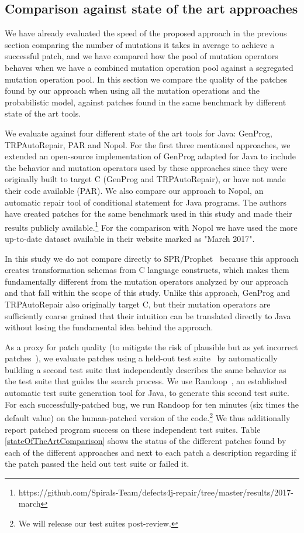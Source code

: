\documentclass[conference]{IEEEtran}
\begin{document}
\subsection{Comparison against state of the art approaches}
We have already evaluated the speed of the proposed approach in the previous section comparing the number of mutations it takes in average to achieve a successful patch, and we have compared how the pool of mutation operators behaves when we have a combined mutation operation pool against a segregated mutation operation pool.
In this section we compare the quality of the patches found by our approach when using all the mutation operations and the probabilistic model, against patches found in the same benchmark by different state of the art tools.

We evaluate against four different state of the art tools for Java: GenProg, TRPAutoRepair, PAR and Nopol.
For the first three mentioned approaches, we extended an open-source implementation of GenProg adapted for Java to include the behavior and mutation operators used by these approaches since they were originally built to target C (GenProg and TRPAutoRepair), or have not made their code available (PAR). We also compare our approach to Nopol\cite{xuan:hal-01285008}, an automatic repair tool of conditional statement for Java programs. The authors have created patches for the same benchmark used in this study\cite{martinez2016} and made their results publicly available.\footnote{https://github.com/Spirals-Team/defects4j-repair/tree/master/results/2017-march} For the comparison with Nopol we have used the more up-to-date dataset available in their website marked as "March 2017".

In this study we do not compare directly to SPR/Prophet~\cite{long16proph} because this approach creates transformation schemas from C language constructs, which makes them fundamentally different from the mutation operators analyzed by our approach and that fall within the scope of this study. Unlike this approach, GenProg and TRPAutoRepair also originally target C, but their mutation operators are sufficiently coarse grained that their intuition can be translated directly to Java without losing the fundamental idea behind the approach. 

As a proxy for patch quality (to
mitigate the risk of plausible but as yet incorrect patches~\cite{Qi15}), we
evaluate patches using a held-out test suite~\cite{legoues2012,Smith15} by automatically building a second
test suite that independently describes the same behavior as the test suite that
guides the search process. We use Randoop~\cite{pacheco07}, an established
automatic test suite generation tool for Java, to generate this second test
suite. 
For each successfully-patched bug, we 
run Randoop for ten minutes (six times the default value) on the human-patched
version of the code.\footnote{We will release our test suites post-review.}  We
thus additionally report patched program success on these independent test
suites. 
Table \ref{stateOfTheArtComparison} shows the status of the different patches found by each of the different approaches and next to each patch a description regarding if the patch passed the held out test suite or failed it.
\end{document}
